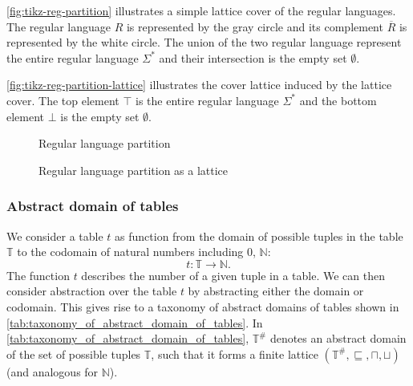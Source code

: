 \begin{example}
    \autoref{fig:tikz-reg-partition} illustrates a simple lattice cover of the regular languages.
    The regular language $R$ is represented by the gray circle and its complement $\overline{R}$ is represented by the white circle.
    The union of the two regular language represent the entire regular language $\Sigma^*$ and their intersection is the empty set $\emptyset$.

    \autoref{fig:tikz-reg-partition-lattice} illustrates the cover lattice induced by the lattice cover.
    The top element $\top$ is the entire regular language $\Sigma^*$ and the bottom element $\bot$ is the empty set $\emptyset$.
\end{example}

\begin{figure}
    \center
    
    \caption{Regular language partition}
    \label{fig:tikz-reg-partition}
\end{figure}

\begin{figure}[!htb]
    \center
    
    \caption{Regular language partition as a lattice}
    \label{fig:tikz-reg-partition-lattice}
\end{figure}

\subsubsection{Abstract domain of tables}\label{subsubsec:abstract_domain_of_tables}

We consider a table $t$ as function from the domain of possible tuples in the table $\mathbb{T}$ to the codomain of natural numbers including $0$, $\mathbb{N}$:
\begin{equation}
    t : \mathbb{T} \rightarrow \mathbb{N}.
\end{equation}
The function $t$ describes the number of a given tuple in a table.
We can then consider abstraction over the table $t$ by abstracting either the domain or codomain.
This gives rise to a taxonomy of abstract domains of tables shown in \autoref{tab:taxonomy_of_abstract_domain_of_tables}.
In \autoref{tab:taxonomy_of_abstract_domain_of_tables}, $\mathbb{T}^\#$ denotes an abstract domain of the set of possible tuples $\mathbb{T}$, such that it forms a finite lattice $(\mathbb{T}^\#, \sqsubseteq, \sqcap, \sqcup)$ (and analogous for $\mathbb{N}$).


